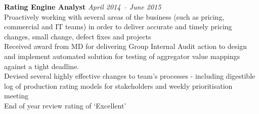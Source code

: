 \documentclass[11pt]{article}
\begin{document}
\begin{description}
\textbf{Rating Engine Analyst} \emph{April 2014 -- June 2015}\\
\textbullet \quad Proactively working with several areas of the business (such as pricing, commercial and IT teams) in order to deliver accurate and timely pricing changes, small change, defect fixes and projects\\
\textbullet \quad Received award from MD for delivering Group Internal Audit action to design and implement automated solution for testing of aggregator value mappings against a tight deadline.\\
\textbullet \quad Devised several highly effective changes to team's processes - including digestible log of production rating models for stakeholders and weekly prioritisation meeting \\
\textbullet \quad End of year review rating of `Excellent'
\end{description}
\end{document}
